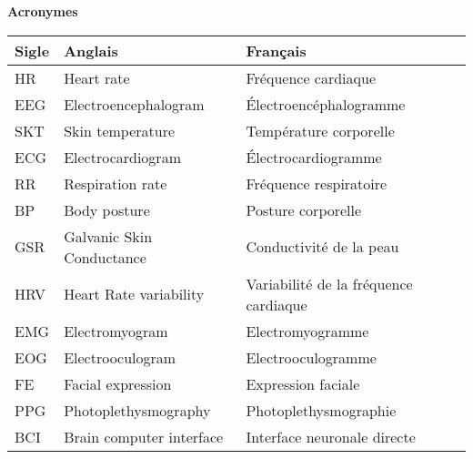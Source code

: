 \documentclass{article}
\begin{document}
\newpage
\begin{center}
    \textbf{Acronymes}\label{app:annexe2}\medskip \\
    \begin{tabular}{|l|l|l|}
        \hline 
        Sigle & Anglais & Français\\
        \hline
        HR & Heart rate & Fréquence cardiaque \\
        EEG & Electroencephalogram & Électroencéphalogramme\\
        SKT & Skin temperature & Température corporelle\\
        ECG & Electrocardiogram & Électrocardiogramme\\
        RR & Respiration rate & Fréquence respiratoire\\
        BP & Body posture & Posture corporelle\\
        GSR & Galvanic Skin Conductance & Conductivité de la peau\\
        HRV & Heart Rate variability & Variabilité de la fréquence cardiaque\\
        EMG & Electromyogram & Electromyogramme\\
        EOG & Electrooculogram & Electrooculogramme\\
        FE & Facial expression & Expression faciale\\
        PPG & Photoplethysmography & Photoplethysmographie\\
        BCI & Brain computer interface & Interface neuronale directe\\
        \hline
    \end{tabular}
\end{center}

\newpage
\renewcommand{\contentsname}{Table des matières}\tableofcontents

\newpage
\end{document}
